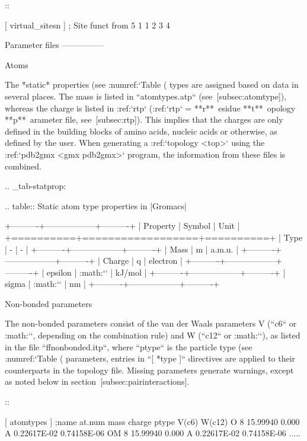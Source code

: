 ::

    [ virtual_sitesn ]
    ; Site   funct    from
    5        1        1     2     3     4

Parameter files
---------------

Atoms
~~~~~

The *static* properties (see  :numref:`Table (%
types are assigned based on data in several places. The mass is listed
in ``atomtypes.atp`` (see [subsec:atomtype]), whereas the charge is listed
in :ref:`rtp` (:ref:`rtp` = **r**\ esidue **t**\ opology **p**\ arameter file,
see [subsec:rtp]). This implies that the charges are only defined in the
building blocks of amino acids, nucleic acids or otherwise, as defined
by the user. When generating a :ref:`topology <top>` using the :ref:`pdb2gmx <gmx pdb2gmx>`
program, the information from these files is combined.

.. _tab-statprop:

.. table:: Static atom type properties in |Gromacs|

           +----------+------------------+----------+
           | Property | Symbol           | Unit     |
           +==========+==================+==========+
           | Type     | -                | -        |
           +----------+------------------+----------+
           | Mass     | m                | a.m.u.   |
           +----------+------------------+----------+
           | Charge   | q                | electron |
           +----------+------------------+----------+
           | epsilon  | :math:`\epsilon` | kJ/mol   |
           +----------+------------------+----------+
           | sigma    | :math:`\sigma`   | nm       |
           +----------+------------------+----------+


Non-bonded parameters
~~~~~~~~~~~~~~~~~~~~~

The non-bonded parameters consist of the van der Waals parameters V (``c6``
or :math:`\sigma`, depending on the combination rule) and W (``c12`` or
:math:`\epsilon`), as listed in the file ``ffnonbonded.itp``, where ``ptype`` is
the particle type (see :numref:`Table (%
parameters, entries in ``[ *type ]`` directives are applied to their counterparts in
the topology file. Missing parameters generate warnings, except as noted
below in section [subsec:pairinteractions].

::

    [ atomtypes ]
    ;name   at.num      mass      charge   ptype         V(c6)        W(c12)
        O        8  15.99940       0.000       A   0.22617E-02   0.74158E-06
       OM        8  15.99940       0.000       A   0.22617E-02   0.74158E-06
       .....

